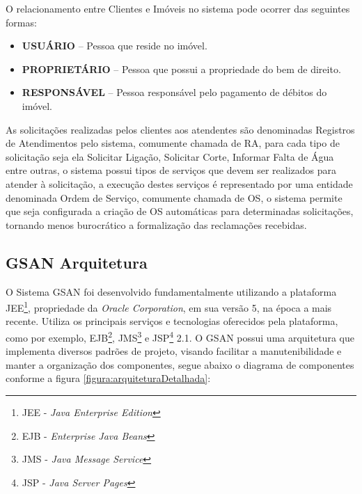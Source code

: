 O relacionamento entre Clientes e Imóveis no sistema pode ocorrer das seguintes formas:
\begin{itemize}
	\item \textbf{USUÁRIO} – Pessoa que reside no imóvel.
	\item \textbf{PROPRIETÁRIO} – Pessoa que possui a propriedade do bem de direito.
	\item \textbf{RESPONSÁVEL} – Pessoa responsável pelo pagamento de débitos do imóvel.	
\end{itemize}

As solicitações realizadas pelos clientes aos atendentes são denominadas Registros de Atendimentos pelo sistema, comumente chamada de RA, para cada tipo de solicitação seja ela Solicitar Ligação, Solicitar Corte, Informar Falta de Água entre outras, o sistema possui tipos de serviços que devem ser realizados para atender à solicitação, a execução destes serviços é representado por uma  entidade denominada Ordem de Serviço, comumente chamada de OS, o sistema permite que seja configurada a criação de OS automáticas para determinadas solicitações, tornando menos burocrático a formalização das reclamações recebidas.


\subsection{\textbf{GSAN Arquitetura}}
	
O Sistema GSAN foi desenvolvido fundamentalmente utilizando a plataforma JEE\footnote{JEE - \textit{Java Enterprise Edition}}, propriedade da \textit{Oracle Corporation}, em sua versão 5, na época a mais recente. Utiliza os principais serviços e tecnologias oferecidos pela plataforma, como por exemplo, EJB\footnote{EJB - \textit{Enterprise Java Beans}}, JMS\footnote{JMS - \textit{Java Message Service}} e JSP\footnote{JSP - \textit{Java Server Pages}} 2.1.
O GSAN possui uma arquitetura que implementa diversos padrões de projeto, visando facilitar a manutenibilidade e manter a organização dos componentes, segue abaixo o diagrama de componentes conforme a figura \ref{figura:arquiteturaDetalhada}:

